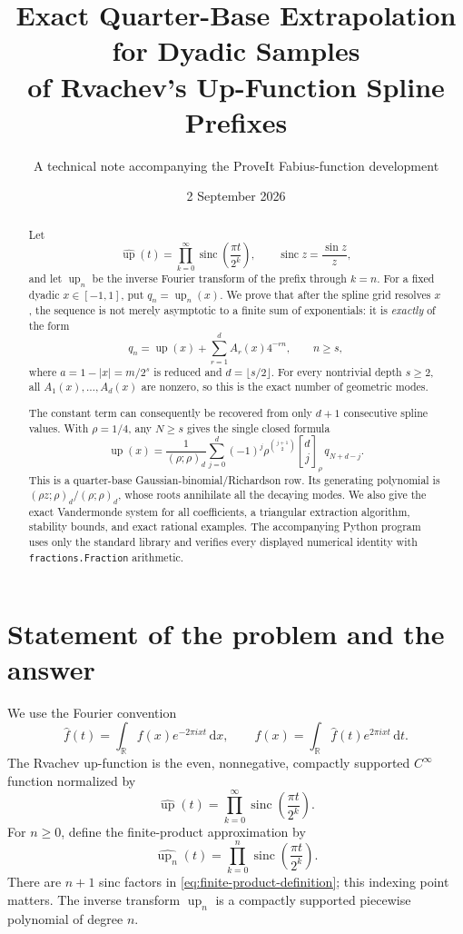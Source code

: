 \documentclass[11pt]{article}
\title{\bfseries Exact Quarter-Base Extrapolation for Dyadic Samples\\
       of Rvachev's Up-Function Spline Prefixes}
\author{A technical note accompanying the ProveIt Fabius-function development}
\date{2 September 2026}
\newcommand{\R}{\mathbb{R}}
\newcommand{\upf}{\operatorname{up}}
\newcommand{\sinc}{\operatorname{sinc}}
\newcommand{\dd}{\,\mathrm{d}}
\newcommand{\qbinom}[3]{\genfrac{[}{]}{0pt}{}{#1}{#2}_{#3}}
\newcommand{\poch}[3]{\left(#1;#2\right)_{#3}}
\begin{document}
\maketitle

\begin{abstract}
Let
\[
 \widehat{\upf}(t)=\prod_{k=0}^{\infty}
 \sinc\!\left(\frac{\pi t}{2^k}\right),
 \qquad \sinc z=\frac{\sin z}{z},
\]
and let $\upf_n$ be the inverse Fourier transform of the prefix through $k=n$.
For a fixed dyadic $x\in[-1,1]$, put $q_n=\upf_n(x)$.  We prove that after the
spline grid resolves $x$, the sequence is not merely asymptotic to a finite
sum of exponentials: it is \emph{exactly} of the form
\[
 q_n=\upf(x)+\sum_{r=1}^{d}A_r(x)4^{-rn},
 \qquad n\ge s,
\]
where $a=1-|x|=m/2^s$ is reduced and $d=\lfloor s/2\rfloor$.  For every
nontrivial depth $s\ge2$, all $A_1(x),\ldots,A_d(x)$ are nonzero, so this is
the exact number of geometric modes.

The constant term can consequently be recovered from only $d+1$ consecutive
spline values.  With $\rho=1/4$, any $N\ge s$ gives the single closed formula
\[
 \boxed{
 \upf(x)=\frac{1}{\poch{\rho}{\rho}{d}}
 \sum_{j=0}^{d}(-1)^j\rho^{\binom{j+1}{2}}
 \qbinom{d}{j}{\rho}\,q_{N+d-j}.}
\]
This is a quarter-base Gaussian-binomial/Richardson row.  Its generating
polynomial is $\poch{\rho z}{\rho}{d}/\poch{\rho}{\rho}{d}$, whose roots
annihilate all the decaying modes.  We also give the exact Vandermonde system
for all coefficients, a triangular extraction algorithm, stability bounds,
and exact rational examples.  The accompanying Python program uses only the
standard library and verifies every displayed numerical identity with
\texttt{fractions.Fraction} arithmetic.
\end{abstract}

\tableofcontents

\section{Statement of the problem and the answer}

We use the Fourier convention
\begin{equation}
 \widehat f(t)=\int_{\R}f(x)e^{-2\pi ixt}\dd x,
 \qquad
 f(x)=\int_{\R}\widehat f(t)e^{2\pi ixt}\dd t.
 \label{eq:fourier-convention}
\end{equation}
The Rvachev up-function is the even, nonnegative, compactly supported
$C^\infty$ function normalized by
\begin{equation}
 \widehat{\upf}(t)=\prod_{k=0}^{\infty}
 \sinc\!\left(\frac{\pi t}{2^k}\right).
 \label{eq:up-fourier-product}
\end{equation}
For $n\ge0$, define the finite-product approximation by
\begin{equation}
 \widehat{\upf_n}(t)=\prod_{k=0}^{n}
 \sinc\!\left(\frac{\pi t}{2^k}\right).
 \label{eq:finite-product-definition}
\end{equation}
There are $n+1$ sinc factors in \eqref{eq:finite-product-definition}; this
indexing point matters.  The inverse transform $\upf_n$ is a compactly
supported piecewise polynomial of degree $n$.
\end{document}
